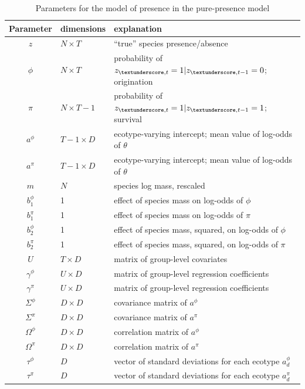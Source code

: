 \documentclass[12pt,letterpaper]{article}
\begin{document}
\begin{table}
  \centering
  \caption{Parameters for the model of presence in the pure-presence model}
  \begin{tabular}{c l l}
    Parameter & dimensions & explanation \\
    \hline
    \(z\) & \(N \times T\) & ``true'' species presence/absence \\
    \(\phi\) & \(N \times T\) & probability of \(z_{\textunderscore, t} = 1 | z_{\textunderscore, t - 1} = 0 \); origination \\
    \(\pi\) & \(N \times T - 1\) & probability of \(z_{\textunderscore, t} = 1 | z_{\textunderscore, t - 1} = 1 \); survival \\
    \(a^{\phi}\) & \(T - 1 \times D\) & ecotype-varying intercept; mean value of log-odds of \(\theta\) \\
    \(a^{\pi}\) & \(T - 1 \times D\) & ecotype-varying intercept; mean value of log-odds of \(\theta\) \\
    \(m\) & \(N\) & species log mass, rescaled \\
    \(b^{\phi}_{1}\) & 1 & effect of species mass on log-odds of \(\phi\) \\
    \(b^{\pi}_{1}\) & 1 & effect of species mass on log-odds of \(\pi\) \\
    \(b^{\phi}_{2}\) & 1 & effect of species mass, squared, on log-odds of \(\phi\) \\
    \(b^{\pi}_{2}\) & 1 & effect of species mass, squared, on log-odds of \(\pi\) \\
    \(U\) & \(T \times D\) & matrix of group-level covariates \\
    \(\gamma^{\phi}\) & \(U \times D\) & matrix of group-level regression coefficients \\
    \(\gamma^{\pi}\) & \(U \times D\) & matrix of group-level regression coefficients \\
    \(\Sigma^{\phi}\) & \(D \times D\) & covariance matrix of \(a^{\phi}\) \\
    \(\Sigma^{\pi}\) & \(D \times D\) & covariance matrix of \(a^{\pi}\) \\
    \(\Omega^{\phi}\) & \(D \times D\) & correlation matrix of \(a^{\phi}\) \\
    \(\Omega^{\pi}\) & \(D \times D\) & correlation matrix of \(a^{\pi}\) \\
    \(\tau^{\phi}\) & \(D\) & vector of standard deviations for each ecotype \(a^{\phi}_{d}\) \\
    \(\tau^{\pi}\) & \(D\) & vector of standard deviations for each ecotype \(a^{\pi}_{d}\) \\
  \end{tabular}
  \label{tab:bd_param}
\end{table}
\end{document}
